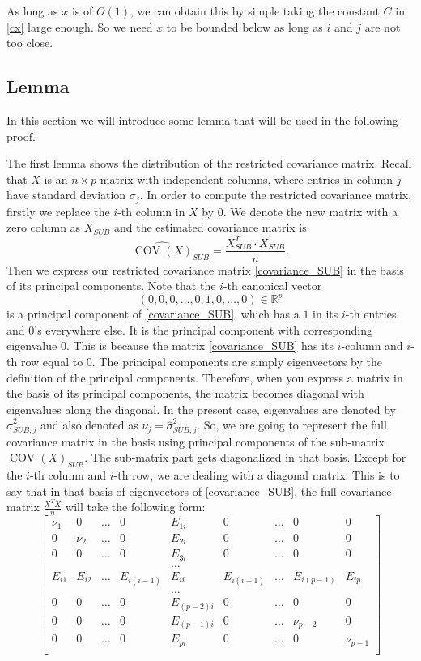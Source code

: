 \documentclass[12pt]{amsart}
\theoremstyle{definition}
\DeclareMathOperator{\Cov}{COV}
\numberwithin{equation}{section}
\numberwithin{equation}{section}
\theoremstyle{remark}
\numberwithin{equation}{section}
\begin{document}
As long as $x$ is of $O(1)$, we can obtain this by simple taking
the constant $C$ in \ref{cx} large enough. So we need $x$ to be
bounded below as long as $i$ and $j$ are not too close.

\subsection{Lemma}
In this section we will introduce some lemma that will be used in the following proof.

The first lemma shows the distribution of the restricted covariance matrix.
Recall that $X$ is an $n\times p$ matrix with independent columns, where
entries in column $j$ have standard deviation $\sigma_j$. In order to compute the restricted covariance matrix, firstly we replace the $i$-th column in $X$ by $0$. We denote the new matrix with a zero column as $X_{SUB}$ and the estimated covariance matrix is
\begin{equation}
\label{covariance_SUB}
\hat{\Cov(X)}_{SUB}=\frac{X^T_{SUB}\cdot X_{SUB}}{n}.
\end{equation}
Then we express our restricted covariance matrix \ref{covariance_SUB} in the basis of its principal components. Note that the $i$-th canonical vector $$(0,0,0,\ldots,0,1,0,\ldots,0) \in \mathbb{R}^{p}$$
is a principal component of \ref{covariance_SUB}, which has a $1$ in its $i$-th entries and $0$'s everywhere else. It is the principal component with corresponding eigenvalue $0$. This is because the matrix \ref{covariance_SUB} has its $i$-column and $i$-th row equal to $0$. The principal components are simply eigenvectors by the definition of the principal components. Therefore, when you express a matrix in the basis of its principal components, the matrix becomes diagonal with eigenvalues along the diagonal. In the present case, eigenvalues are denoted by $\hat{\sigma}_{SUB,j}^2$ and also denoted as $\nu_j=\hat{\sigma}_{SUB,j}^2$. So, we are going to represent the full covariance matrix in the basis using principal components of the sub-matrix $\Cov(X)_{SUB}$. The sub-matrix part gets diagonalized in that basis. Except for the $i$-th column and $i$-th row, we are dealing with a diagonal matrix. This is to say that in that basis of eigenvectors of \ref{covariance_SUB}, the full covariance matrix $\frac{X^T X}{n}$ will take the following form:
\begin{equation}
\label{covariancep}
\left[\begin{array}{ccccccccc}
\nu_1&0&\ldots&0&E_{1i}&0&\ldots&0&0\\
0&\nu_2&\ldots&0&E_{2i}&0&\ldots&0&0\\
0&0&\ldots&0&E_{3i}&0&\ldots&0&0\\
&&&&\ldots&&&&\\
E_{i1}&E_{i2}&\ldots&E_{i(i-1)}&E_{ii}&E_{i(i+1)}&\ldots&E_{i(p-1)}&E_{ip}\\
&&&&\ldots&&&&\\
0&0&\ldots&0&E_{(p-2)i}&0&\ldots&0&0\\
0&0&\ldots&0&E_{(p-1)i}&0&\ldots&\nu_{p-2}&0\\
0&0&\ldots&0&E_{pi}&0&\ldots&0&\nu_{p-1}\\
\end{array}
\right]
\end{equation}
\end{document}

